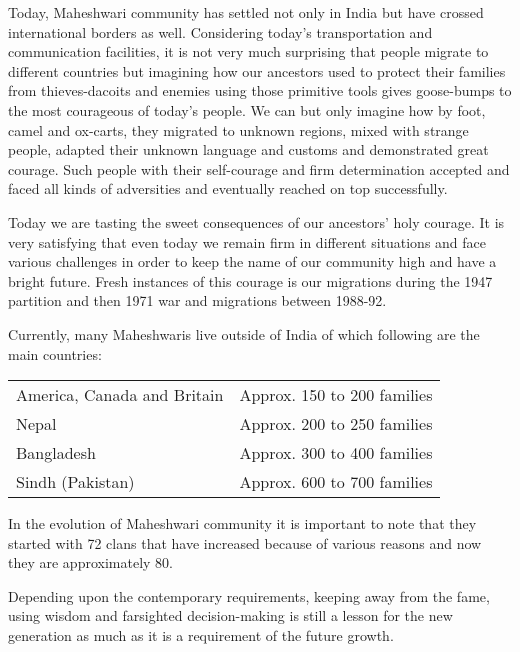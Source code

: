 Today, Maheshwari community has settled not only in India but have crossed
international borders as well. Considering today's transportation and
communication facilities, it is not very much surprising that people migrate to
different countries but imagining how our ancestors used to protect their
families from thieves-dacoits and enemies using those primitive tools gives
goose-bumps to the most courageous of today's people. We can but only imagine
how by foot, camel and ox-carts, they migrated to unknown regions, mixed with
strange people, adapted their unknown language and customs and demonstrated
great courage. Such people with their self-courage and firm determination
accepted and faced all kinds of adversities and eventually reached on top
successfully.

Today we are tasting the sweet consequences of our ancestors' holy courage. It
is very satisfying that even today we remain firm in different situations and
face various challenges in order to keep the name of our community high and
have a bright future. Fresh instances of this courage is our migrations during
the 1947 partition and then 1971 war and migrations between 1988-92.

Currently, many Maheshwaris live outside of India of which following are the main countries:
\begin{center}
\begin{tabular}{ll}
America, Canada and Britain & Approx. 150 to 200 families \\ 
Nepal & Approx. 200 to 250 families \\ 
Bangladesh & Approx. 300 to 400 families \\ 
Sindh (Pakistan) & Approx. 600 to 700 families
\end{tabular}
\end{center}

In the evolution of Maheshwari community it is important to note that they
started with 72 clans that have increased because of various reasons and now
they are approximately 80.

Depending upon the contemporary requirements, keeping away from the fame, using
wisdom and farsighted decision-making is still a lesson for the new generation
as much as it is a requirement of the future growth.
